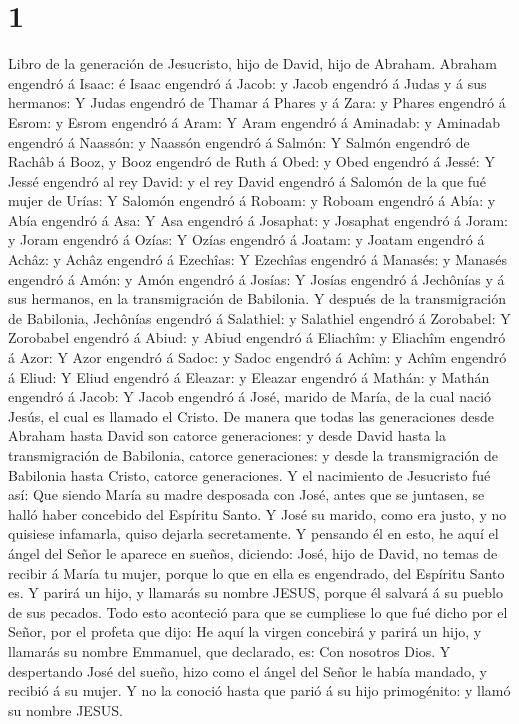 \hypertarget{section}{%
\section{1}\label{section}}

 Libro de la generación de Jesucristo, hijo de David, hijo
de Abraham.  Abraham engendró á Isaac: é Isaac engendró á
Jacob: y Jacob engendró á Judas y á sus hermanos:  Y Judas
engendró de Thamar á Phares y á Zara: y Phares engendró á Esrom: y Esrom
engendró á Aram:  Y Aram engendró á Aminadab: y Aminadab
engendró á Naassón: y Naassón engendró á Salmón:  Y Salmón
engendró de Rachâb á Booz, y Booz engendró de Ruth á Obed: y Obed
engendró á Jessé:  Y Jessé engendró al rey David: y el rey
David engendró á Salomón de la que fué mujer de Urías:  Y
Salomón engendró á Roboam: y Roboam engendró á Abía: y Abía engendró á
Asa:  Y Asa engendró á Josaphat: y Josaphat engendró á
Joram: y Joram engendró á Ozías:  Y Ozías engendró á Joatam:
y Joatam engendró á Achâz: y Achâz engendró á Ezechîas:  Y
Ezechîas engendró á Manasés: y Manasés engendró á Amón: y Amón engendró
á Josías:  Y Josías engendró á Jechônías y á sus hermanos,
en la transmigración de Babilonia.  Y después de la
transmigración de Babilonia, Jechônías engendró á Salathiel: y Salathiel
engendró á Zorobabel:  Y Zorobabel engendró á Abiud: y
Abiud engendró á Eliachîm: y Eliachîm engendró á Azor:  Y
Azor engendró á Sadoc: y Sadoc engendró á Achîm: y Achîm engendró á
Eliud:  Y Eliud engendró á Eleazar: y Eleazar engendró á
Mathán: y Mathán engendró á Jacob:  Y Jacob engendró á
José, marido de María, de la cual nació Jesús, el cual es llamado el
Cristo.  De manera que todas las generaciones desde Abraham
hasta David son catorce generaciones: y desde David hasta la
transmigración de Babilonia, catorce generaciones: y desde la
transmigración de Babilonia hasta Cristo, catorce generaciones.
 Y el nacimiento de Jesucristo fué así: Que siendo María su
madre desposada con José, antes que se juntasen, se halló haber
concebido del Espíritu Santo.  Y José su marido, como era
justo, y no quisiese infamarla, quiso dejarla secretamente.
 Y pensando él en esto, he aquí el ángel del Señor le
aparece en sueños, diciendo: José, hijo de David, no temas de recibir á
María tu mujer, porque lo que en ella es engendrado, del Espíritu Santo
es.  Y parirá un hijo, y llamarás su nombre JESUS, porque
él salvará á su pueblo de sus pecados.  Todo esto aconteció
para que se cumpliese lo que fué dicho por el Señor, por el profeta que
dijo:  He aquí la virgen concebirá y parirá un hijo, y
llamarás su nombre Emmanuel, que declarado, es: Con nosotros Dios.
 Y despertando José del sueño, hizo como el ángel del Señor
le había mandado, y recibió á su mujer.  Y no la conoció
hasta que parió á su hijo primogénito: y llamó su nombre JESUS.

